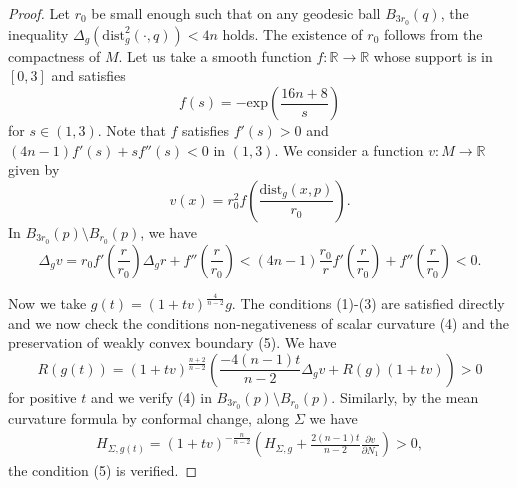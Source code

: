 \documentclass[11pt,letterpaper]{amsart}
\begin{document}
\begin{proof}
    Let $r_0$ be small enough such that on any geodesic ball $B_{3r_0}(q)$, the inequality $\Delta_g(\text{dist}_g^2(\cdot,q))<4n$ holds. The existence of $r_0$ follows from the compactness of $M$. Let us take a smooth function $f: \mathbb{R} \rightarrow \mathbb{R}$ whose support is in $[0,3]$ and satisfies
    \begin{equation*}
    f(s) = -\text{exp}\left( \frac{16n+8}{s}\right)
    \end{equation*}
    for $s \in (1,3)$. Note that $f$ satisfies $f'(s) >0$ and $(4n-1) f'(s) + sf''(s) <0$ in $(1,3)$. We consider a function $v : M \rightarrow \mathbb{R}$ given by
    \begin{equation*}
        v(x) = r_{0}^{2} f \left( \frac{\text{dist}_{g}(x,p)}{r_{0}}\right).
    \end{equation*}
    In $B_{3r_{0}}(p) \setminus B_{r_{0}}(p)$, we have
    \begin{equation*}
        \Delta_{g}v = r_{0} f'\left( \frac{r}{r_{0}} \right) \Delta_{g}r + f''\left( \frac{r}{r_{0}} \right) < (4n-1) \frac{r_{0}}{r} f'\left( \frac{r}{r_{0}} \right)  + f''\left( \frac{r}{r_{0}} \right)<0.
    \end{equation*}

    Now we take $g(t) = (1+tv)^{\frac{4}{n-2}} g$. The conditions (1)-(3) are satisfied directly and we now check the conditions non-negativeness of scalar curvature (4) and the preservation of weakly convex boundary (5). We have
    \begin{equation*}
        R(g(t)) = (1+tv)^{\frac{n+2}{n-2}} \left( \frac{-4(n-1)t}{n-2} \Delta_{g} v + R(g)(1+tv) \right)>0
    \end{equation*}
    for positive $t$ and we verify (4) in $B_{3r_0}(p)\setminus B_{r_0}(p)$.
    Similarly, by the mean curvature formula by conformal change, along $\Sigma$ we have
    \begin{align*}
        H_{\Sigma,g(t)}=(1+tv)^{-\frac{n}{n-2}}\left(H_{\Sigma,g}+\frac{2(n-1)t}{n-2}\frac{\partial v}{\partial N_1}\right)>0,
    \end{align*}
    the condition (5) is verified. 
\end{proof}





\end{document}
